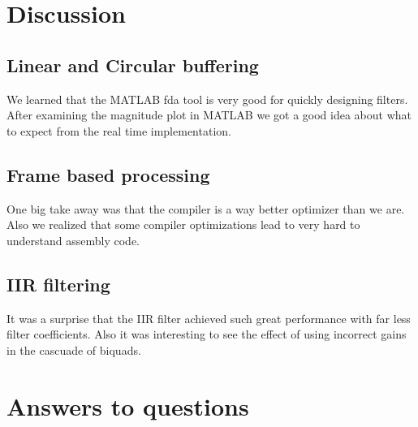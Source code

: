 \documentclass{article}
\begin{document}

\section{Discussion}

\subsection{Linear and Circular buffering}

We learned that the MATLAB fda tool is very good for quickly designing filters.
After examining the magnitude plot in MATLAB we got a good idea about what to expect from the real time implementation.

\subsection{Frame based processing}

One big take away was that the compiler is a way better optimizer than we are.
Also we realized that some compiler optimizations lead to very hard to understand assembly code.

\subsection{IIR filtering}

It was a surprise that the IIR filter achieved such great performance with far less filter coefficients.
Also it was interesting to see the effect of using incorrect gains in the cascuade of biquads.


\section{Answers to questions}
\end{document}
